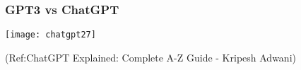 \begin{frame}[fragile]\frametitle{GPT3 vs ChatGPT}


\begin{center}
\texttt{[image: chatgpt27]}
\end{center}		

\tiny{(Ref:ChatGPT Explained: Complete A-Z Guide - Kripesh Adwani)}
\end{frame}


















